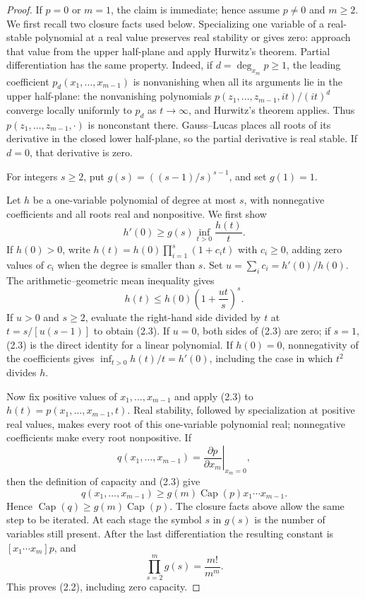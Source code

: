 \documentclass[11pt]{article}
\begin{document}
\begin{proof}
If $p=0$ or $m=1$, the claim is immediate; hence assume $p\ne0$
and $m\ge2$. We first
recall two closure facts used below. Specializing one variable of a real-stable
polynomial at a real value preserves real stability or gives zero: approach
that value from the upper half-plane and apply Hurwitz's theorem. Partial
differentiation has the same property. Indeed, if $d=\deg_{x_m}p\ge1$, the
leading coefficient $p_d(x_1,\ldots,x_{m-1})$ is nonvanishing when all its
arguments lie in the upper half-plane: the nonvanishing polynomials
$p(z_1,\ldots,z_{m-1},it)/(it)^d$ converge locally uniformly to $p_d$ as
$t\to\infty$, and Hurwitz's theorem applies. Thus
$p(z_1,\ldots,z_{m-1},\cdot)$ is nonconstant there. Gauss--Lucas places all
roots of its derivative in the closed lower half-plane, so the partial
derivative is real stable. If $d=0$, that derivative is zero.

For integers $s\ge2$, put
$g(s)=((s-1)/s)^{s-1}$, and set $g(1)=1$.

Let $h$ be a one-variable polynomial of degree at most $s$, with nonnegative
coefficients and all roots real and nonpositive. We first show
\[
h'(0)\ge g(s)\inf_{t>0}\frac{h(t)}t.
\tag{2.3}
\]
If $h(0)>0$, write
$h(t)=h(0)\prod_{i=1}^s(1+c_it)$ with $c_i\ge0$, adding zero values of $c_i$
when the degree is smaller than $s$. Set
$u=\sum_i c_i=h'(0)/h(0)$. The arithmetic--geometric mean inequality gives
\[
h(t)\le h(0)\left(1+\frac{ut}{s}\right)^s.
\]
If $u>0$ and $s\ge2$, evaluate the right-hand side divided by $t$ at
$t=s/[u(s-1)]$ to obtain (2.3). If $u=0$, both sides of (2.3) are zero; if
$s=1$, (2.3) is the direct identity for a linear polynomial. If $h(0)=0$,
nonnegativity of the coefficients gives
$\inf_{t>0}h(t)/t=h'(0)$, including the case in which $t^2$ divides $h$.

Now fix positive values of $x_1,\ldots,x_{m-1}$ and apply (2.3) to
$h(t)=p(x_1,\ldots,x_{m-1},t)$. Real stability, followed by specialization at
positive real values, makes every root of this one-variable polynomial real;
nonnegative coefficients make every root nonpositive. If
\[
q(x_1,\ldots,x_{m-1})=
\left.\frac{\partial p}{\partial x_m}\right|_{x_m=0},
\]
then the definition of capacity and (2.3) give
\[
q(x_1,\ldots,x_{m-1})
\ge g(m)\operatorname{Cap}(p)x_1\cdots x_{m-1}.
\]
Hence $\operatorname{Cap}(q)\ge g(m)\operatorname{Cap}(p)$. The closure facts
above allow the same step to be iterated. At each stage the symbol $s$ in
$g(s)$ is the number of
variables still present. After the last differentiation the resulting
constant is $[x_1\cdots x_m]p$, and
\[
\prod_{s=2}^m g(s)=\frac{m!}{m^m}.
\]
This proves (2.2), including zero capacity.
\end{proof}
\end{document}

